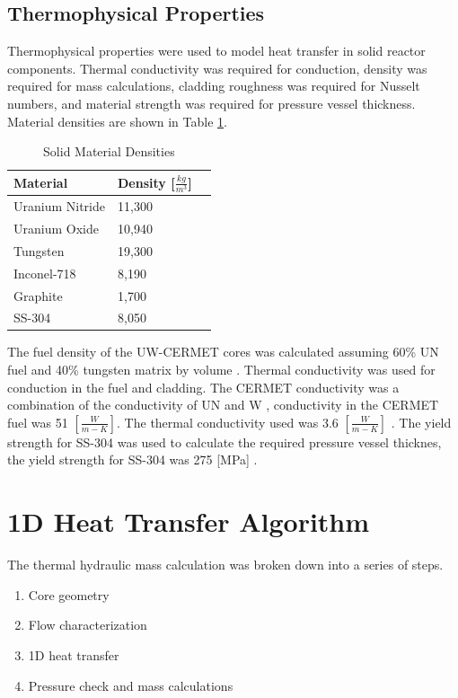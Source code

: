 \subsection{Thermophysical Properties}
Thermophysical properties were used to model heat transfer in solid reactor
components. Thermal conductivity was required for conduction, density was
required for mass calculations, cladding roughness was required for Nusselt
numbers, and material strength was required for pressure vessel thickness.
Material densities are shown in Table \ref{tab:densities}.

\begin{table}[h]
  \centering
  \caption{Solid Material Densities}
  \begin{tabular}{lll}
    \toprule
     Material        & Density  [$\frac{kg}{m^3}$]     \\ 
    \midrule                                  
     Uranium Nitride & 11,300 \\
     Uranium Oxide   & 10,940 \\
     Tungsten        & 19,300 \\
     Inconel-718     & 8,190  \\
     Graphite        & 1,700  \\
     SS-304          & 8,050
  \end{tabular}
  \label{tab:densities}
\end{table}

The fuel density of the UW-CERMET cores was calculated assuming 60\% UN fuel and
40\% tungsten matrix by volume \citep{conduct_cermet}. Thermal conductivity was
used for conduction in the fuel and cladding. The CERMET conductivity was a
combination of the conductivity of UN and W \citep{conduct_cermet}, conductivity
in the CERMET fuel was 51 $[\frac{W}{m-K}]$. The \uox thermal conductivity used
was 3.6 $[\frac{W}{m-K}]$ \citep{todreas_th}. The yield strength for SS-304 was
used to calculate the required pressure vessel thicknes, the yield strength for
SS-304 was 275 [MPa] \citep{ss_strength}.

\section{1D Heat Transfer Algorithm}
The thermal hydraulic mass calculation was broken down into a series of steps.
\begin{enumerate}
    \item Core geometry
    \item Flow characterization
    \item 1D heat transfer
    \item Pressure check and mass calculations
\end{enumerate}

